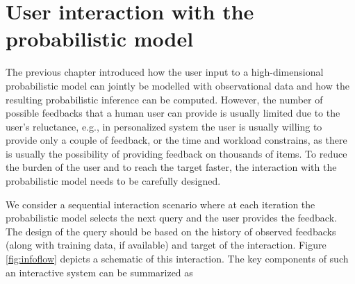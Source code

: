 \documentclass[dissertation,math,vertlayout,pdfa,colorlinks]{aaltoseries}
\begin{document}
	
 










\chapter{User interaction with the probabilistic model}\label{interaction}


 
The previous chapter introduced how the user input to a high-dimensional probabilistic model can jointly be modelled with observational data and how the resulting probabilistic inference can be computed. However, the number of possible feedbacks that a human user can provide is usually limited due to the user's reluctance, e.g., in personalized system the user is usually willing to provide only a couple of feedback, or the time and workload constrains, as there is usually the possibility of providing feedback on thousands of items. To reduce the burden of the user and to reach the target faster, the interaction with the probabilistic model needs to be carefully designed. 

We consider a sequential interaction scenario where at each iteration the probabilistic model selects the next query and the user provides the feedback. The design of the query should be based on the history of observed feedbacks (along with training data, if available) and target of the interaction. Figure \ref{fig:infoflow} depicts a schematic of this interaction. The key components of such an interactive system can be summarized as
\end{document}
